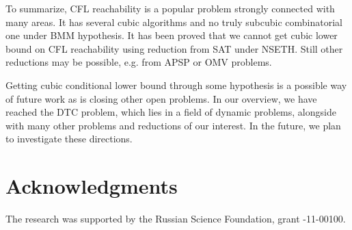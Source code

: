\documentclass[acmsmall,nonacm]{acmart}
\begin{document}
	To summarize, CFL reachability is a popular problem strongly connected with many areas. It has several cubic algorithms and no truly subcubic combinatorial one under BMM hypothesis. It has been proved that we cannot get cubic lower bound on CFL reachability using reduction from SAT under NSETH. Still other reductions may be possible, e.g. from APSP or OMV problems. 
	
	Getting cubic conditional lower bound through some hypothesis is a possible way of future work as is closing other open problems. In our overview, we have reached the DTC problem, which lies in a field of dynamic problems, alongside with many other problems and reductions of our interest. In the future, we plan to investigate these directions. 
	
	\section{Acknowledgments}
	
	The research was supported by the Russian Science Foundation, grant -11-00100.
	
	
	
	
	
\end{document}
